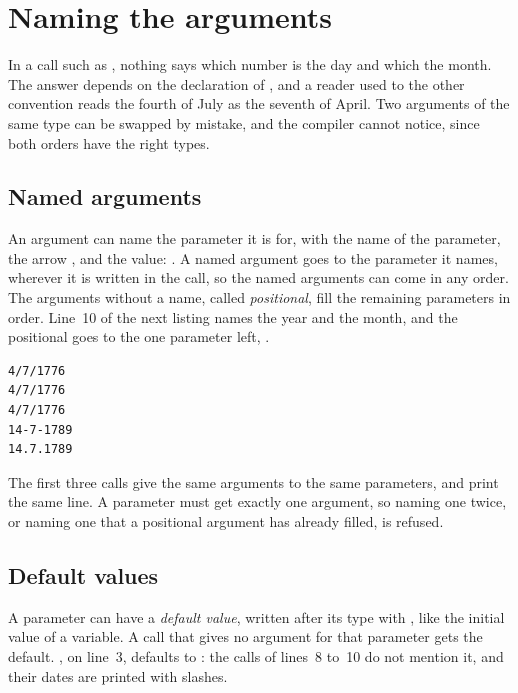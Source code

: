 \vfill\pagebreak
\section{Naming the arguments}
\label{sec:functions:named_arguments}

In a call such as , nothing says which number is
the day and which the month. The answer depends on the declaration of
, and a reader used to the other convention reads the fourth of
July as the seventh of April. Two arguments of the same type can be swapped by
mistake, and the compiler cannot notice, since both orders have the right types.

\subsection{Named arguments}

An argument can name the parameter it is for, with the name of the parameter,
the arrow \token{->}, and the value: . A named argument goes to the parameter it names, wherever it is
written in the call, so the named arguments can come in any order. The arguments
without a name, called \textit{positional}, fill the remaining parameters in
order. Line~10 of the next listing names the year and the month, and the
positional  goes to the one parameter left, .


\vspace{-10pt}%
\begin{lstlisting}[style=bashVerb]
4/7/1776
4/7/1776
4/7/1776
14-7-1789
14.7.1789
\end{lstlisting}

The first three calls give the same arguments to the same parameters, and print
the same line. A parameter must get exactly one argument, so naming one twice,
or naming one that a positional argument has already filled, is refused.

\subsection{Default values}

A parameter can have a \textit{default value}, written after its type with
\token{=}, like the initial value of a variable. A call that gives no argument
for that parameter gets the default. , on line~3, defaults to
: the calls of lines~8 to~10 do not mention it, and their dates are
printed with slashes.

